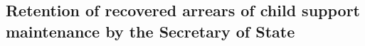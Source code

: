 \documentclass[12pt,a4paper]{article}
\begin{document}
%
%
%

%

\subsection[8. Retention of recovered arrears of child support maintenance by the Secretary of State]{\sloppy Retention of recovered arrears of child support maintenance by the Secretary of State}
\end{document}
